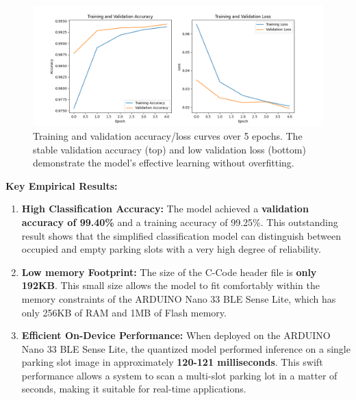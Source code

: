 \documentclass[sigconf,10pt,nonacm]{acmart}
\begin{document}
\begin{figure}[h!]
  \centering
  \includegraphics[width=\linewidth]{./images/training_results.png}
  \caption{Training and validation accuracy/loss curves over 5 epochs. The stable validation accuracy (top) and low validation loss (bottom) demonstrate the model's effective learning without overfitting.}
  \label{fig:training_results}
\end{figure}

\noindent\textbf{Key Empirical Results:}
\begin{enumerate}
    \item \textbf{High Classification Accuracy:} The model achieved a \textbf{validation accuracy of 99.40\%} and a training accuracy of 99.25\%. This outstanding result shows that the simplified classification model can distinguish between occupied and empty parking slots with a very high degree of reliability.
    \item \textbf{Low memory Footprint:} The size of the C-Code header file is \textbf{only 192KB}. This small size allows the model to fit comfortably within the memory constraints of the ARDUINO Nano 33 BLE Sense Lite, which has only 256KB of RAM and 1MB of Flash memory.
    \item \textbf{Efficient On-Device Performance:} When deployed on the ARDUINO Nano 33 BLE Sense Lite, the quantized model performed inference on a single parking slot image in approximately \textbf{120-121 milliseconds}. This swift performance allows a system to scan a multi-slot parking lot in a matter of seconds, making it suitable for real-time applications.
\end{enumerate}
\end{document}
